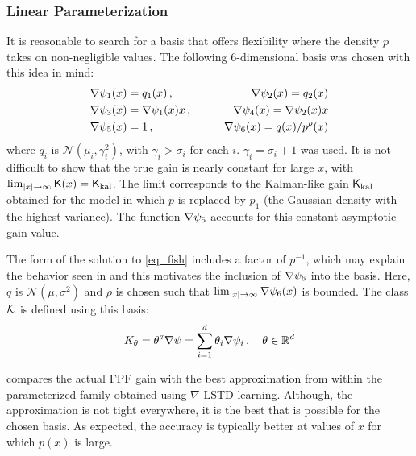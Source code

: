 \subsubsection*{Linear Parameterization}

It is reasonable to search for a basis that offers flexibility where the density $p$ takes on non-negligible values.  The following $6$-dimensional basis was chosen with this idea in mind:
\begin{equation*}
\begin{aligned}
\nabla \psi_{1}(x) & = q_1(x)
\, ,\qquad
&\nabla \psi_{2}(x)  = q_2(x)
\\
\nabla \psi_{3}(x) & = \nabla \psi_{1}(x) x \, ,\qquad
&\nabla \psi_{4}(x)  = \nabla \psi_{2}(x) x \\
\nabla \psi_{5}(x) &= 1 \,  ,\qquad &\nabla \psi_{6}(x) =q(x)/p^{\rho}(x)
\end{aligned}
\end{equation*}
where $q_i$ is $\mathcal{N}(\mu_i,\gamma_i^2)$, with $\gamma_i>\sigma_i$ for each $i$. $\gamma_i=\sigma_i+1$ was used. It is not difficult to show that the true gain is nearly constant for large $x$, with $\lim_{|x|\to\infty} \text{\sf K}(x) = \sf K_{\text{kal}}$. The limit corresponds to the Kalman-like gain $\sf K_{\text{kal}}$ obtained for the model in which $p$ is replaced by $p_1$  (the Gaussian density with the highest variance). The function $\nabla \psi_{5}$ accounts for this constant asymptotic gain value.

The form of the solution to \eqref{eq_fish} includes a factor of $p^{-1}$, which may explain the behavior seen in  and this motivates the inclusion of $\nabla \psi_{6}$ into the basis. Here, $q$ is $\mathcal{N}(\mu,\sigma^{2})$ and $\rho$ is chosen such that $\lim_{|x|\to\infty}\nabla \psi_{6}(x)$ is bounded. The class ${\cal K}$ is defined using this basis:
\begin{equation*}
K_\theta = \theta^{{\hbox{\tiny\it T}}}\nabla \psi = \sum_{i=1}^{d}\theta_{i}\nabla \psi_{i}\,, \quad\theta\in\mathbb{R}^d
\end{equation*}

 compares the actual FPF gain with the best approximation from within the parameterized family obtained using $\nabla$-LSTD learning. Although, the approximation is not tight everywhere, it is the best that is possible for the chosen basis. As expected, the accuracy is typically better at values of $x$ for which $p(x)$ is large.

